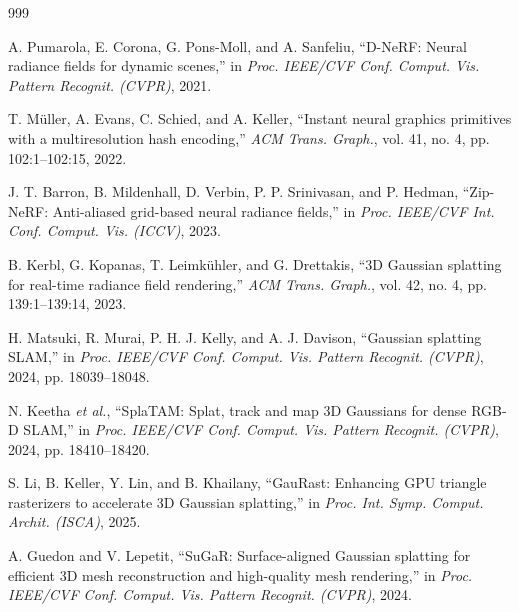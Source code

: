 \documentclass[12pt,a4paper,oneside]{report}
\begin{document}
\begin{thebibliography}{999}

A. Pumarola, E. Corona, G. Pons-Moll, and A. Sanfeliu, ``D-NeRF: Neural radiance fields for dynamic scenes,'' in \textit{Proc. IEEE/CVF Conf. Comput. Vis. Pattern Recognit. (CVPR)}, 2021.




T. M\"uller, A. Evans, C. Schied, and A. Keller, ``Instant neural graphics primitives with a multiresolution hash encoding,'' \textit{ACM Trans. Graph.}, vol. 41, no. 4, pp. 102:1--102:15, 2022.




J. T. Barron, B. Mildenhall, D. Verbin, P. P. Srinivasan, and P. Hedman, ``Zip-NeRF: Anti-aliased grid-based neural radiance fields,'' in \textit{Proc. IEEE/CVF Int. Conf. Comput. Vis. (ICCV)}, 2023.





B. Kerbl, G. Kopanas, T. Leimk\"{u}hler, and G. Drettakis, ``{3D} Gaussian splatting for real-time radiance field rendering,'' \textit{ACM Trans. Graph.}, vol. 42, no. 4, pp. 139:1--139:14, 2023.




H. Matsuki, R. Murai, P. H. J. Kelly, and A. J. Davison, ``Gaussian splatting {SLAM},'' in \textit{Proc. IEEE/CVF Conf. Comput. Vis. Pattern Recognit. (CVPR)}, 2024, pp. 18039--18048.




N. Keetha \textit{et al.}, ``{SplaTAM}: Splat, track and map {3D} Gaussians for dense {RGB-D SLAM},'' in \textit{Proc. IEEE/CVF Conf. Comput. Vis. Pattern Recognit. (CVPR)}, 2024, pp. 18410--18420.




S. Li, B. Keller, Y. Lin, and B. Khailany, ``{GauRast}: Enhancing {GPU} triangle rasterizers to accelerate {3D} Gaussian splatting,'' in \textit{Proc. Int. Symp. Comput. Archit. (ISCA)}, 2025.




A. Guedon and V. Lepetit, ``{SuGaR}: Surface-aligned {Gaussian} splatting for efficient {3D} mesh reconstruction and high-quality mesh rendering,'' in \textit{Proc. IEEE/CVF Conf. Comput. Vis. Pattern Recognit. (CVPR)}, 2024.




\end{thebibliography}
\end{document}
